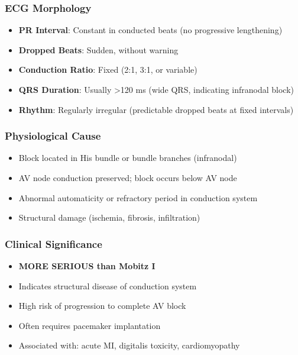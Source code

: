 \documentclass[11pt, a4paper]{article}
\begin{document}
\subsubsection{ECG Morphology}
\begin{itemize}
    \item \textbf{PR Interval}: Constant in conducted beats (no progressive lengthening)
    \item \textbf{Dropped Beats}: Sudden, without warning
    \item \textbf{Conduction Ratio}: Fixed (2:1, 3:1, or variable)
    \item \textbf{QRS Duration}: Usually >120 ms (wide QRS, indicating infranodal block)
    \item \textbf{Rhythm}: Regularly irregular (predictable dropped beats at fixed intervals)
\end{itemize}

\subsubsection{Physiological Cause}
\begin{itemize}
    \item Block located in His bundle or bundle branches (infranodal)
    \item AV node conduction preserved; block occurs below AV node
    \item Abnormal automaticity or refractory period in conduction system
    \item Structural damage (ischemia, fibrosis, infiltration)
\end{itemize}

\subsubsection{Clinical Significance}
\begin{itemize}
    \item \textbf{MORE SERIOUS than Mobitz I}
    \item Indicates structural disease of conduction system
    \item High risk of progression to complete AV block
    \item Often requires pacemaker implantation
    \item Associated with: acute MI, digitalis toxicity, cardiomyopathy
\end{itemize}
\end{document}
